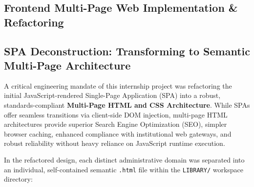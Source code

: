 \documentclass[10pt,journal,compsoc]{IEEEtran}
\begin{document}
\newpage

\subsection{Frontend Multi-Page Web Implementation \& Refactoring}

\subsection{SPA Deconstruction: Transforming to Semantic Multi-Page Architecture}
A critical engineering mandate of this internship project was refactoring the initial JavaScript-rendered Single-Page Application (SPA) into a robust, standards-compliant \textbf{Multi-Page HTML and CSS Architecture}. While SPAs offer seamless transitions via client-side DOM injection, multi-page HTML architectures provide superior Search Engine Optimization (SEO), simpler browser caching, enhanced compliance with institutional web gateways, and robust reliability without heavy reliance on JavaScript runtime execution.

In the refactored design, each distinct administrative domain was separated into an individual, self-contained semantic \texttt{.html} file within the \texttt{LIBRARY/} workspace directory:
\end{document}
